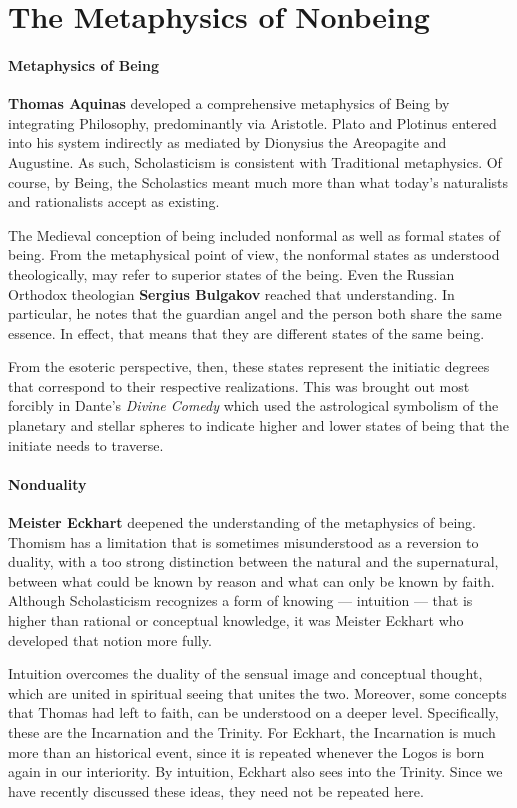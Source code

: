 \section{The Metaphysics of Nonbeing}

\paragraph{Metaphysics of Being}
\textbf{Thomas Aquinas} developed a comprehensive metaphysics of Being by integrating Philosophy, predominantly via Aristotle. Plato and Plotinus entered into his system indirectly as mediated by Dionysius the Areopagite and Augustine. As such, Scholasticism is consistent with Traditional metaphysics. Of course, by Being, the Scholastics meant much more than what today's naturalists and rationalists accept as existing.

The Medieval conception of being included nonformal as well as formal states of being. From the metaphysical point of view, the nonformal states as understood theologically, may refer to superior states of the being. Even the Russian Orthodox theologian \textbf{Sergius Bulgakov} reached that understanding. In particular, he notes that the guardian angel and the person both share the same essence. In effect, that means that they are different states of the same being.

From the esoteric perspective, then, these states represent the initiatic degrees that correspond to their respective realizations. This was brought out most forcibly in Dante's \emph{Divine Comedy} which used the astrological symbolism of the planetary and stellar spheres to indicate higher and lower states of being that the initiate needs to traverse.

\paragraph{Nonduality}
\textbf{Meister Eckhart} deepened the understanding of the metaphysics of being. Thomism has a limitation that is sometimes misunderstood as a reversion to duality, with a too strong distinction between the natural and the supernatural, between what could be known by reason and what can only be known by faith. Although Scholasticism recognizes a form of knowing — intuition — that is higher than rational or conceptual knowledge, it was Meister Eckhart who developed that notion more fully.

Intuition overcomes the duality of the sensual image and conceptual thought, which are united in spiritual seeing that unites the two. Moreover, some concepts that Thomas had left to faith, can be understood on a deeper level. Specifically, these are the Incarnation and the Trinity. For Eckhart, the Incarnation is much more than an historical event, since it is repeated whenever the Logos is born again in our interiority. By intuition, Eckhart also sees into the Trinity. Since we have recently discussed these ideas, they need not be repeated here.

